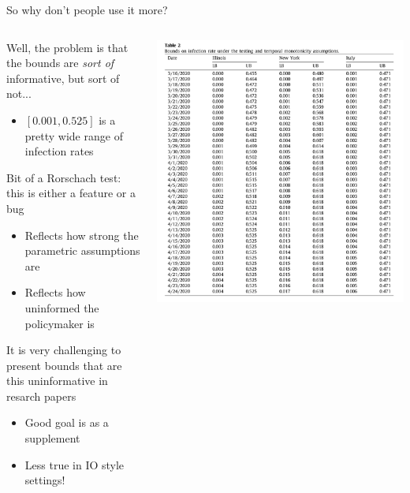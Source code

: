 \documentclass[notes,11pt, aspectratio=169]{beamer}
\newenvironment{wideitemize}{\itemize\addtolength{\itemsep}{10pt}}{\enditemize}
\begin{document}
  
\begin{frame}{So why don't people use it more?}
      \begin{columns}[onlytextwidth, T] %
        \begin{column}{.5\textwidth}
          \begin{wideitemize}
          \item Well, the problem is that the bounds are \emph{sort of} informative, but sort of not...
            \begin{itemize}
            \item $[0.001,0.525]$ is a pretty wide range of infection rates
            \end{itemize}
          \item Bit of a Rorschach test: this is either a feature or a
            bug
            \begin{itemize}
            \item Reflects how strong the parametric assumptions are
            \item Reflects how uninformed the policymaker is
            \end{itemize}
          \item It is very challenging to present bounds that are this
            uninformative in resarch papers
            \begin{itemize}
            \item Good goal is as a supplement
            \item Less true in IO style settings!
            \end{itemize}
          \end{wideitemize}
      \end{column}%
      \hfill%
      \begin{column}{.5\textwidth}
        \includegraphics[width=\linewidth]{images/manksi_molinari_2.png}

\end{column}
\end{columns}
\end{frame}
\end{document}

